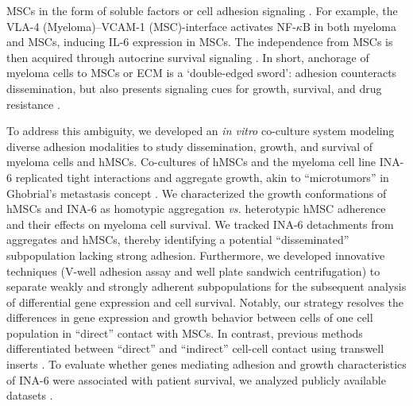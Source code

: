 MSCs in the form of soluble factors or cell adhesion signaling
\cite{garcia-ortizRoleTumorMicroenvironment2021,
    chatterjeePresenceBoneMarrow2002, hideshimaUnderstandingMultipleMyeloma2007}.
For example, the VLA-4 (Myeloma)–VCAM-1 (MSC)-interface activates NF-$\kappa$B in
both myeloma and MSCs, inducing IL-6 expression in MSCs. The independence from
MSCs is then acquired through autocrine survival signaling
\cite{frassanitoAutocrineInterleukin6Production2001,
    urashimaCD40LigandTriggered1995}. In short, anchorage of myeloma cells to MSCs
or ECM is a ‘double-edged sword': adhesion counteracts dissemination, but also
presents signaling cues for growth, survival, and drug resistance
\cite{solimandoDrugResistanceMultiple2022}.


To address this ambiguity, we developed an \textit{in vitro} co-culture system
modeling diverse adhesion modalities to study dissemination, growth, and
survival of myeloma cells and hMSCs. Co-cultures of hMSCs and the myeloma cell
line INA-6 replicated tight interactions and aggregate growth, akin to
``microtumors'' in Ghobrial's metastasis concept
\cite{ghobrialMyelomaModelProcess2012}. We characterized the growth
conformations of hMSCs and INA-6 as homotypic aggregation \textit{vs.}
heterotypic hMSC adherence and their effects on myeloma cell survival. We
tracked INA-6 detachments from aggregates and hMSCs, thereby identifying a
potential ``disseminated'' subpopulation lacking strong adhesion. Furthermore,
we developed innovative techniques (V-well adhesion assay and well plate
sandwich centrifugation) to separate weakly and strongly adherent subpopulations
for the subsequent analysis of differential gene expression and cell survival.
Notably, our strategy resolves the differences in gene expression and growth
behavior between cells of one cell population in ``direct'' contact with MSCs.
In contrast, previous methods differentiated between ``direct'' and ``indirect''
cell-cell contact using transwell inserts
\cite{dziadowiczBoneMarrowStromaInduced2022}. To evaluate whether genes
mediating adhesion and growth characteristics of INA-6 were associated with
patient survival, we analyzed publicly available datasets
\cite{seckingerTargetExpressionGeneration2017b,seckingerCD38ImmunotherapeuticTarget2018}.


\newpage



